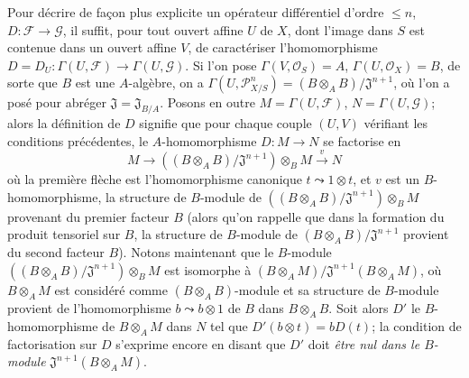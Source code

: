 \begin{env}[16.8.2]
\label{IV.16.8.2}
Pour décrire de façon plus explicite un opérateur différentiel d'ordre
$\leq n$, $D:\mathscr{F}\to\mathscr{G}$, il suffit, pour tout ouvert affine
$U$ de $X$, dont l'image dans $S$ est contenue dans un ouvert affine $V$, de
caractériser l'homomorphisme
$D=D_U:\Gamma(U,\mathscr{F})\to\Gamma(U,\mathscr{G})$. Si l'on pose
$\Gamma(V,\mathcal{O}_S)=A$, $\Gamma(U,\mathcal{O}_X)=B$, de sorte que $B$
est une $A$-algèbre, on a $\Gamma(U,\mathscr{P}_{X/S}^n)=(B\otimes_A B)/\mathfrak{J}^{n+1}$,
où l'on a posé pour abréger $\mathfrak{J}=\mathfrak{J}_{B/A}$. Posons en
outre $M=\Gamma(U,\mathscr{F})$, $N=\Gamma(U,\mathscr{G})$; alors la
définition de $D$ signifie que pour chaque couple $(U,V)$ vérifiant les
conditions précédentes, le $A$-homomorphisme $D:M\to N$ se factorise en
\[
  M\longrightarrow
  ((B\otimes_A B)/\mathfrak{J}^{n+1})\otimes_B M
  \xrightarrow{v}N
\]
où la première flèche est l'homomorphisme canonique $t\leadsto1\otimes t$, et
$v$ est un $B$-homomorphisme, la structure de $B$-module de
$((B\otimes_A B)/\mathfrak{J}^{n+1})\otimes_B M$ provenant du premier
facteur $B$ (alors qu'on rappelle que dans la formation du produit tensoriel
sur $B$, la structure de $B$-module de
$(B\otimes_A B)/\mathfrak{J}^{n+1}$ provient du second facteur $B$). Notons
maintenant que le $B$-module
$((B\otimes_A B)/\mathfrak{J}^{n+1})\otimes_B M$ est isomorphe à
$(B\otimes_A M)/\mathfrak{J}^{n+1}(B\otimes_A M)$, où $B\otimes_A M$ est
considéré comme $(B\otimes_A B)$-module et sa structure de $B$-module
provient de l'homomorphisme $b\leadsto b\otimes1$ de $B$ dans $B\otimes_A B$.
Soit alors $D'$ le $B$-homomorphisme de $B\otimes_A M$ dans $N$ tel que
$D'(b\otimes t)=bD(t)$; la condition de factorisation sur $D$ s'exprime encore
en disant que $D'$ doit \emph{être nul dans le $B$-module}
$\mathfrak{J}^{n+1}(B\otimes_A M)$.
\end{env}

